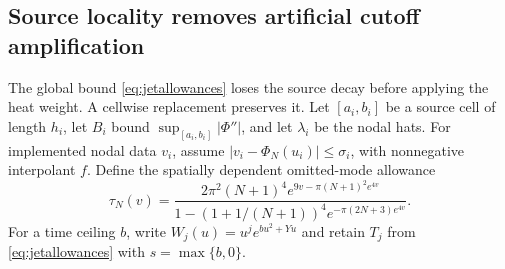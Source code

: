 \subsection{Source locality removes artificial cutoff amplification}
The global bound \eqref{eq:jetallowances} loses the source decay before
applying the heat weight. A cellwise replacement preserves it. Let
$[a_i,b_i]$ be a source cell of length $h_i$, let $B_i$ bound
$\sup_{[a_i,b_i]}|\Phi''|$, and let $\lambda_i$ be the nodal hats.
For implemented nodal data $v_i$, assume
$|v_i-\Phi_N(u_i)|\le\sigma_i$, with nonnegative interpolant $f$.
Define the spatially dependent omitted-mode allowance
\begin{equation}
 \tau_N(v)=\frac{2\pi^2(N+1)^4e^{9v-\pi(N+1)^2e^{4v}}}
 {1-(1+1/(N+1))^4e^{-\pi(2N+3)e^{4v}}}.
 \label{eq:localmodetail}
\end{equation}
For a time ceiling $b$, write $W_j(u)=u^je^{bu^2+Yu}$ and retain
$T_j$ from \eqref{eq:jetallowances} with $s=\max\{b,0\}$.

